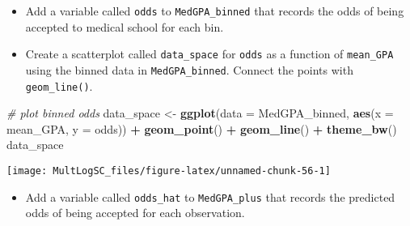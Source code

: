 \documentclass[]{book}
\newenvironment{Shaded}{\begin{snugshade}}{\end{snugshade}}
\newcommand{\KeywordTok}[1]{\textcolor[rgb]{0.13,0.29,0.53}{\textbf{#1}}}
\newcommand{\DataTypeTok}[1]{\textcolor[rgb]{0.13,0.29,0.53}{#1}}
\newcommand{\DecValTok}[1]{\textcolor[rgb]{0.00,0.00,0.81}{#1}}
\newcommand{\StringTok}[1]{\textcolor[rgb]{0.31,0.60,0.02}{#1}}
\newcommand{\CommentTok}[1]{\textcolor[rgb]{0.56,0.35,0.01}{\textit{#1}}}
\newcommand{\OperatorTok}[1]{\textcolor[rgb]{0.81,0.36,0.00}{\textbf{#1}}}
\newcommand{\NormalTok}[1]{#1}
\providecommand{\tightlist}{%
  \setlength{\itemsep}{0pt}\setlength{\parskip}{0pt}}
\begin{document}
\begin{itemize}
\tightlist
\item
  Add a variable called \texttt{odds} to \texttt{MedGPA\_binned} that
  records the odds of being accepted to medical school for each bin.
\end{itemize}

\begin{Shaded}
\end{Shaded}

\begin{itemize}
\tightlist
\item
  Create a scatterplot called \texttt{data\_space} for \texttt{odds} as
  a function of \texttt{mean\_GPA} using the binned data in
  \texttt{MedGPA\_binned}. Connect the points with
  \texttt{geom\_line()}.
\end{itemize}

\begin{Shaded}
\begin{Highlighting}[]
\CommentTok{# plot binned odds}
\NormalTok{data_space <-}\StringTok{ }\KeywordTok{ggplot}\NormalTok{(}\DataTypeTok{data =}\NormalTok{ MedGPA_binned, }
                     \KeywordTok{aes}\NormalTok{(}\DataTypeTok{x =}\NormalTok{ mean_GPA, }\DataTypeTok{y =}\NormalTok{ odds)) }\OperatorTok{+}\StringTok{ }
\StringTok{  }\KeywordTok{geom_point}\NormalTok{() }\OperatorTok{+}\StringTok{ }
\StringTok{  }\KeywordTok{geom_line}\NormalTok{() }\OperatorTok{+}\StringTok{ }
\StringTok{  }\KeywordTok{theme_bw}\NormalTok{()}
\NormalTok{data_space}
\end{Highlighting}
\end{Shaded}

\begin{center}\texttt{[image: MultLogSC\_files/figure-latex/unnamed-chunk-56-1]} \end{center}

\begin{itemize}
\tightlist
\item
  Add a variable called \texttt{odds\_hat} to \texttt{MedGPA\_plus} that
  records the predicted odds of being accepted for each observation.
\end{itemize}
\end{document}
